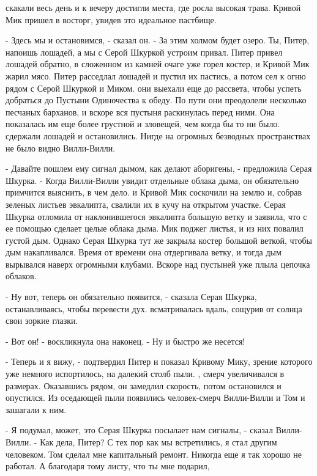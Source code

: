  скакали весь день и к вечеру достигли места, где росла высокая 
трава. Кривой Мик пришел в восторг, увидев это идеальное пастбище.
\par- Здесь мы и остановимся, - сказал он. - За этим холмом будет 
озеро. Ты, Питер, напоишь лошадей, а мы с Серой Шкуркой устроим 
привал.
 Питер привел лошадей обратно, в сложенном из камней очаге 
уже горел костер, и Кривой Мик жарил мясо. Питер расседлал лошадей и 
пустил их пастись, а потом сел к огню рядом с Серой Шкуркой и Миком.
 они выехали еще до рассвета, чтобы успеть добраться до 
Пустыни Одиночества к обеду. По пути они преодолели несколько песчаных 
барханов, и вскоре вся пустыня раскинулась перед ними. Она показалась 
им еще более грустной и зловещей, чем когда бы то ни было.
 сдержали лошадей и остановились. Нигде на огромных безводных 
пространствах не было видно Вилли-Вилли.
\par- Давайте пошлем ему сигнал дымом, как делают аборигены, - 
предложила Серая Шкурка. - Когда Вилли-Вилли увидит отдельные облака 
дыма, он обязательно примчится выяснить, в чем дело.
 и Кривой Мик соскочили на землю и, собрав зеленых листьев 
эвкалипта, свалили их в кучу на открытом участке. Серая Шкурка 
отломила от наклонившегося эвкалипта большую ветку и заявила, что с ее 
помощью сделает целые облака дыма.
 Мик поджег листья, и из них повалил густой дым. Однако 
Серая Шкурка тут же закрыла костер большой веткой, чтобы дым 
накапливался. Время от времени она отдергивала ветку, и тогда дым 
вырывался наверх огромными клубами. Вскоре над пустыней уже плыла 
цепочка облаков.
\par- Ну вот, теперь он обязательно появится, - сказала Серая Шкурка, 
останавливаясь, чтобы перевести дух.
 всматривалась вдаль, сощурив от солнца свои зоркие глазки.
\par- Вот он! - воскликнула она наконец. - Ну и быстро же несется!
\par- Теперь и я вижу, - подтвердил Питер и показал Кривому Мику, 
зрение которого уже немного испортилось, на далекий столб пыли.
, смерч увеличивался в размерах. Оказавшись рядом, он 
замедлил скорость, потом остановился и опустился. Из оседающей пыли 
появились человек-смерч Вилли-Вилли и Том и зашагали к ним.
\par- Я подумал, может, это Серая Шкурка посылает нам сигналы, - 
сказал Вилли-Вилли. - Как дела, Питер? С тех пор как мы встретились, я 
стал другим человеком. Том сделал мне капитальный ремонт. Никогда еще 
я так хорошо не работал. А благодаря тому листу, что ты мне подарил, 
